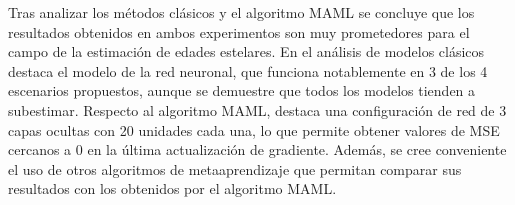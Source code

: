 Tras analizar los métodos clásicos y el algoritmo MAML se concluye que los resultados obtenidos en ambos experimentos son muy prometedores para el campo de la estimación de edades estelares. En el análisis de modelos clásicos destaca el modelo de la red neuronal, que funciona notablemente en 3 de los 4 escenarios propuestos, aunque se demuestre que todos los modelos tienden a subestimar. Respecto al algoritmo MAML, destaca una configuración de red de 3 capas ocultas con 20 unidades cada una, lo que permite obtener valores de MSE cercanos a 0 en la última actualización de gradiente. Además, se cree conveniente el uso de otros algoritmos de metaaprendizaje que permitan comparar sus resultados con los obtenidos por el algoritmo MAML.
